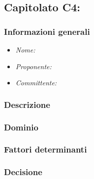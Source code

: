 \subsection{Capitolato C4: \textit{}}
\subsubsection{Informazioni generali}
\begin{itemize}
    \item \textit{Nome:}
    \item \textit{Proponente:}
    \item \textit{Committente:}
\end{itemize}
\subsubsection{Descrizione}
\subsubsection{Dominio}
\subsubsection{Fattori determinanti}
\subsubsection{Decisione}
